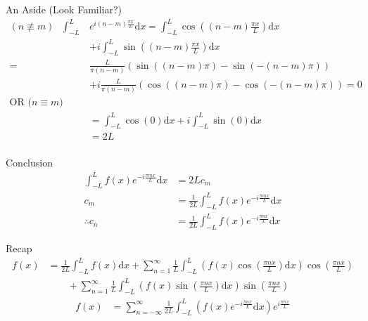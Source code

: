 	\begin{namedframe}{An Aside (Look Familiar?)}
		\begin{align*}
			(n \not\equiv m)\text{ }\int_{-L}^{L}&e^{i(n-m)\frac{\pi x}{L}}\mathrm{d}x = \int_{-L}^{L}\cos\left( (n-m)\frac{\pi x}{L} \right)\mathrm{d}x \\&+ i\int_{-L}^{L}\sin\left( (n-m)\frac{\pi x}{L} \right)\mathrm{d}x\\
			= &\frac{L}{\pi(n-m)}\left(\sin( (n-m)\pi) - \sin(-(n-m)\pi)\right) \\&+ i\frac{L}{\pi(n-m)}\left( \cos( (n-m)\pi) - \cos(-(n-m)\pi)\right) = 0\\
			\text{OR ($n \equiv m$)}\\
			&= \int_{-L}^{L}\cos\left(0\right)\mathrm{d}x + i\int_{-L}^{L}\sin(0)\mathrm{d}x\\
			&= 2L\\
		\end{align*}
	\end{namedframe}
	\begin{namedframe}{Conclusion}
		\begin{align*}
			\int_{-L}^{L}f(x)e^{-i\frac{\pi mx}{L}}\mathrm{d}x &= 2Lc_m\\
			c_m &= \frac{1}{2L}\int_{-L}^{L}f(x)e^{-i\frac{\pi mx}{L}}\mathrm{d}x\\
			\therefore c_n &= \frac{1}{2L}\int_{-L}^{L}f(x)e^{-i\frac{\pi nx}{L}}\mathrm{d}x
		\end{align*}
	\end{namedframe}
	\begin{namedframe}{Recap}
		\begin{align*}
			f(x) &= \frac{1}{2L}\int_{-L}^{L}f(x)\mathrm{d}x + \sum_{n=1}^{\infty}\frac{1}{L}\int_{-L}^{L}\left(f(x)\cos\left(\frac{\pi nx}{L}\right)\mathrm{d}x\right)\cos\left(\frac{\pi nx}{L}\right)\\
			&\qquad+ \sum_{n=1}^{\infty}\frac{1}{L}\int_{-L}^{L}\left(f(x)\sin\left(\frac{\pi nx}{L}\right)\mathrm{d}x\right)\sin\left(\frac{\pi nx}{L}\right)
		\end{align*}
		\begin{align*}
			f(x) &= \sum_{n=-\infty}^{\infty}\frac{1}{2L}\int_{-L}^{L}\left(f(x)e^{-i\frac{\pi nx}{L}}\mathrm{d}x\right)e^{i\frac{\pi nx}{L}}
		\end{align*}
	\end{namedframe}
	
